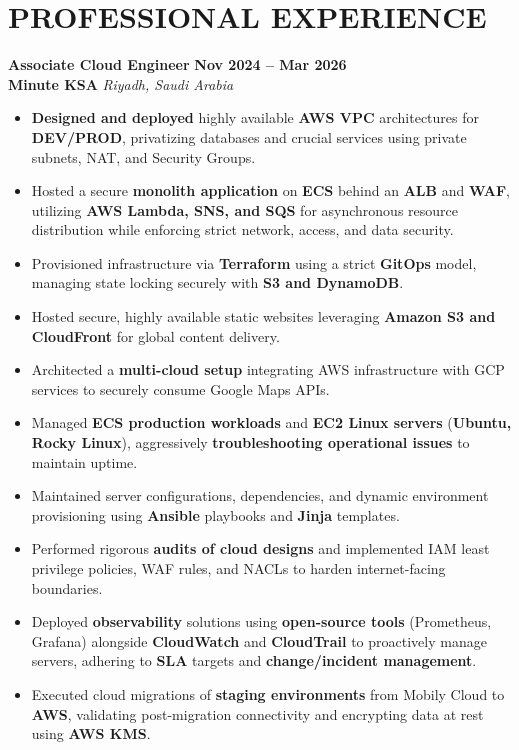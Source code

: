 \documentclass[10pt,a4paper]{article}
\newcommand{\jobheading}[4]{
  \vspace{1.5ex}\noindent
  {\large\textbf{\color{darkteal}#1}} \hfill \textbf{\color{textmain}#2} \\[0.3ex]
  \textbf{\color{textdark}#3} \hfill \textit{\color{textmain}#4} \vspace{0.8ex}
}
\begin{document}
\section*{PROFESSIONAL EXPERIENCE}

\jobheading{Associate Cloud Engineer}{Nov 2024 -- Mar 2026}{Minute KSA}{Riyadh, Saudi Arabia}
\begin{itemize}[label={\color{teal}\textbullet},leftmargin=*,itemsep=5pt,parsep=2pt,topsep=2pt]
\item \textbf{Designed and deployed} highly available \textbf{AWS VPC} architectures for \textbf{DEV/PROD}, privatizing databases and crucial services using private subnets, NAT, and Security Groups.
\item Hosted a secure \textbf{monolith application} on \textbf{ECS} behind an \textbf{ALB} and \textbf{WAF}, utilizing \textbf{AWS Lambda, SNS, and SQS} for asynchronous resource distribution while enforcing strict network, access, and data security.
\item Provisioned infrastructure via \textbf{Terraform} using a strict \textbf{GitOps} model, managing state locking securely with \textbf{S3 and DynamoDB}.
\item Hosted secure, highly available static websites leveraging \textbf{Amazon S3 and CloudFront} for global content delivery.
\item Architected a \textbf{multi-cloud setup} integrating AWS infrastructure with GCP services to securely consume Google Maps APIs.
\item Managed \textbf{ECS production workloads} and \textbf{EC2 Linux servers} (\textbf{Ubuntu, Rocky Linux}), aggressively \textbf{troubleshooting operational issues} to maintain uptime.
\item Maintained server configurations, dependencies, and dynamic environment provisioning using \textbf{Ansible} playbooks and \textbf{Jinja} templates.
\item Performed rigorous \textbf{audits of cloud designs} and implemented IAM least privilege policies, WAF rules, and NACLs to harden internet-facing boundaries.
\item Deployed \textbf{observability} solutions using \textbf{open-source tools} (Prometheus, Grafana) alongside \textbf{CloudWatch} and \textbf{CloudTrail} to proactively manage servers, adhering to \textbf{SLA} targets and \textbf{change/incident management}.
\item Executed cloud migrations of \textbf{staging environments} from Mobily Cloud to \textbf{AWS}, validating post-migration connectivity and encrypting data at rest using \textbf{AWS KMS}.

\end{itemize}
\end{document}
